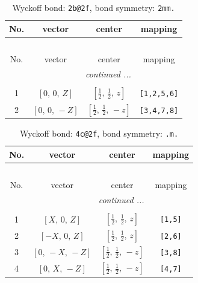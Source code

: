 \documentclass[fleqn,8pt]{jsarticle}
\begin{document}
\renewcommand{\arraystretch}{1.2}
\begin{longtable}{cccc}
\caption{Wyckoff bond: {\tt 2b@2f}, bond symmetry: {\tt 2mm.}}
 \\
 \hline \hline
No. & vector & center & mapping \\ \hline \endfirsthead

\multicolumn{3}{l}{\tablename\ \thetable{}} \\
 \hline \hline
No. & vector & center & mapping \\ \hline \endhead

 \hline \hline
\multicolumn{3}{r}{\footnotesize\it continued ...} \\ \endfoot

 \hline \hline
\multicolumn{3}{r}{} \\ \endlastfoot

1 & $\left[ 0,\, 0,\, Z \right]$ & $\left[ \frac{1}{2},\, \frac{1}{2},\, z \right]$ & {\tt [1,2,5,6]} \\ \hline
2 & $\left[ 0,\, 0,\, - Z \right]$ & $\left[ \frac{1}{2},\, \frac{1}{2},\, - z \right]$ & {\tt [3,4,7,8]} \\
\end{longtable}
\renewcommand{\arraystretch}{1.2}
\begin{longtable}{cccc}
\caption{Wyckoff bond: {\tt 4c@2f}, bond symmetry: {\tt .m.}}
 \\
 \hline \hline
No. & vector & center & mapping \\ \hline \endfirsthead

\multicolumn{3}{l}{\tablename\ \thetable{}} \\
 \hline \hline
No. & vector & center & mapping \\ \hline \endhead

 \hline \hline
\multicolumn{3}{r}{\footnotesize\it continued ...} \\ \endfoot

 \hline \hline
\multicolumn{3}{r}{} \\ \endlastfoot

1 & $\left[ X,\, 0,\, Z \right]$ & $\left[ \frac{1}{2},\, \frac{1}{2},\, z \right]$ & {\tt [1,5]} \\ \hline
2 & $\left[ - X,\, 0,\, Z \right]$ & $\left[ \frac{1}{2},\, \frac{1}{2},\, z \right]$ & {\tt [2,6]} \\ \hline
3 & $\left[ 0,\, - X,\, - Z \right]$ & $\left[ \frac{1}{2},\, \frac{1}{2},\, - z \right]$ & {\tt [3,8]} \\ \hline
4 & $\left[ 0,\, X,\, - Z \right]$ & $\left[ \frac{1}{2},\, \frac{1}{2},\, - z \right]$ & {\tt [4,7]} \\
\end{longtable}
\end{document}

